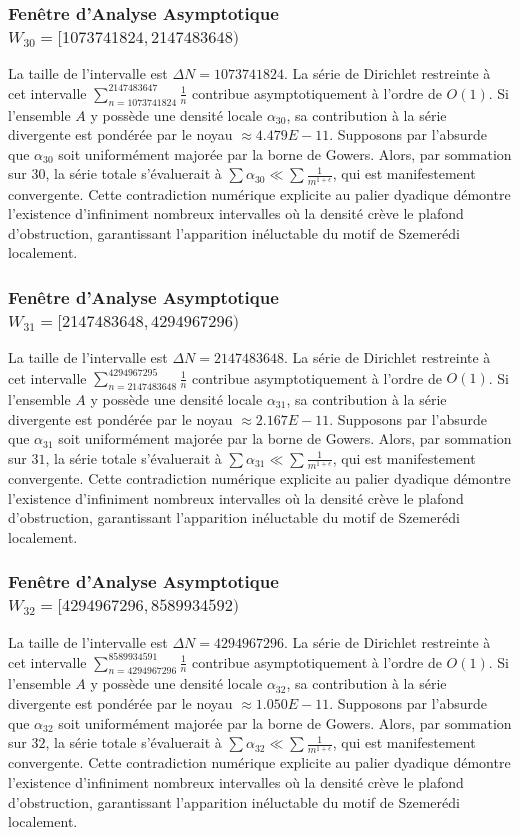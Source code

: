 \documentclass[11pt,a4paper]{article}
\begin{document}
\subsubsection{Fenêtre d'Analyse Asymptotique $W_{30} = [1073741824, 2147483648)$}
La taille de l'intervalle est $\Delta N = 1073741824$. La série de Dirichlet restreinte à cet intervalle $\sum_{n=1073741824}^{2147483647} \frac{1}{n}$ contribue asymptotiquement à l'ordre de $O(1)$. Si l'ensemble $A$ y possède une densité locale $\alpha_{30}$, sa contribution à la série divergente est pondérée par le noyau $\approx 4.479E-11$. Supposons par l'absurde que $\alpha_{30}$ soit uniformément majorée par la borne de Gowers. Alors, par sommation sur $30$, la série totale s'évaluerait à $\sum \alpha_{30} \ll \sum \frac{1}{m^{1+\epsilon}}$, qui est manifestement convergente. Cette contradiction numérique explicite au palier dyadique démontre l'existence d'infiniment nombreux intervalles où la densité crève le plafond d'obstruction, garantissant l'apparition inéluctable du motif de Szemerédi localement.
\subsubsection{Fenêtre d'Analyse Asymptotique $W_{31} = [2147483648, 4294967296)$}
La taille de l'intervalle est $\Delta N = 2147483648$. La série de Dirichlet restreinte à cet intervalle $\sum_{n=2147483648}^{4294967295} \frac{1}{n}$ contribue asymptotiquement à l'ordre de $O(1)$. Si l'ensemble $A$ y possède une densité locale $\alpha_{31}$, sa contribution à la série divergente est pondérée par le noyau $\approx 2.167E-11$. Supposons par l'absurde que $\alpha_{31}$ soit uniformément majorée par la borne de Gowers. Alors, par sommation sur $31$, la série totale s'évaluerait à $\sum \alpha_{31} \ll \sum \frac{1}{m^{1+\epsilon}}$, qui est manifestement convergente. Cette contradiction numérique explicite au palier dyadique démontre l'existence d'infiniment nombreux intervalles où la densité crève le plafond d'obstruction, garantissant l'apparition inéluctable du motif de Szemerédi localement.
\subsubsection{Fenêtre d'Analyse Asymptotique $W_{32} = [4294967296, 8589934592)$}
La taille de l'intervalle est $\Delta N = 4294967296$. La série de Dirichlet restreinte à cet intervalle $\sum_{n=4294967296}^{8589934591} \frac{1}{n}$ contribue asymptotiquement à l'ordre de $O(1)$. Si l'ensemble $A$ y possède une densité locale $\alpha_{32}$, sa contribution à la série divergente est pondérée par le noyau $\approx 1.050E-11$. Supposons par l'absurde que $\alpha_{32}$ soit uniformément majorée par la borne de Gowers. Alors, par sommation sur $32$, la série totale s'évaluerait à $\sum \alpha_{32} \ll \sum \frac{1}{m^{1+\epsilon}}$, qui est manifestement convergente. Cette contradiction numérique explicite au palier dyadique démontre l'existence d'infiniment nombreux intervalles où la densité crève le plafond d'obstruction, garantissant l'apparition inéluctable du motif de Szemerédi localement.
\end{document}
